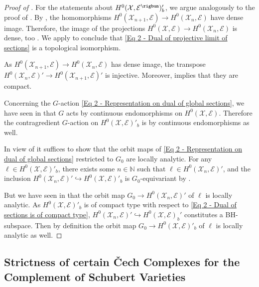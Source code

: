 \documentclass[a4paper, reqno, 10pt]{amsart}
\theoremstyle{definition}
\numberwithin{equation}{section}
\newcommand{\ra}{\rightarrow}
\newcommand{\BN}{{\mathbb {N}}}
\newcommand{\CE}{{\mathcal {E}}}
\newcommand{\CX}{{\mathcal {X}}}
\begin{document}
\begin{proof}[{Proof of }]
	For the statements about $H^0(\CX,\CE^\rigbun)'_b$, we argue analogously to the proof of \cite[Prop.\ 1.4]{SchneiderTeitelbaum02pAdicBoundVal}.
	By , the homomorphisms $H^0(\CX_{n+1},\CE) \ra H^0(\CX_n,\CE)$ have dense image.
	Therefore, the image of the projections $H^0(\CX,\CE) \ra H^0(\CX_n,\CE)$ is dense, too \cite[Ch.\ II.\ \S 3.5 Thm.\ 1]{Bourbaki66GenTop1}.
	We apply \cite[Prop.\ 16.5]{Schneider02NonArchFunctAna} to conclude that \eqref{Eq 2 - Dual of projective limit of sections} is a topological isomorphism.
	
	
	As $H^0(\CX_{n+1},\CE) \ra H^0(\CX_n,\CE)$ has dense image, the transpose $H^0(\CX_n,\CE)' \ra H^0(\CX_{n+1},\CE)'$ is injective.
	Moreover, \cite[Lemma 16.4]{Schneider02NonArchFunctAna} implies that they are compact.
	
	
	Concerning the $G$-action \eqref{Eq 2 - Representation on dual of global sections}, we have seen in  that $G$ acts by continuous endomorphisms on $H^0(\CX, \CE)$.
	Therefore the contragredient $G$-action on $H^0(\CX, \CE)'_b$ is by continuous endomorphisms as well.
	
	
	In view of  it suffices to show that the orbit maps of \eqref{Eq 2 - Representation on dual of global sections} restricted to $G_0$ are locally analytic.
	For any $\ell \in H^0(\CX,\CE)'_b$, there exists some $n\in \BN$ such that $\ell \in H^0(\CX_n,\CE)'$, and the inclusion $H^0(\CX_n, \CE)' \hookrightarrow H^0(\CX,\CE)'_b$ is $G_0$-equivariant by .
	
	
	But we have seen in  that the orbit map $G_0 \ra H^0(\CX_n,\CE)'$ of $\ell$ is locally analytic.
	As $H^0(\CX,\CE)'_b$ is of compact type with respect to \eqref{Eq 2 - Dual of sections is of compact type}, $H^0(\CX_n,\CE)' \hookrightarrow H^0(\CX,\CE)_b'$ constitutes a BH-subspace.
	Then by definition the orbit map $G_0 \ra H^0(\CX,\CE)'_b$ of $\ell$ is locally analytic as well.
\end{proof}



\subsection{Strictness of certain \v{C}ech Complexes for the Complement of Schubert Varieties}\label{Sect 2 - Strictness of certain Cech complexes}
\end{document}
